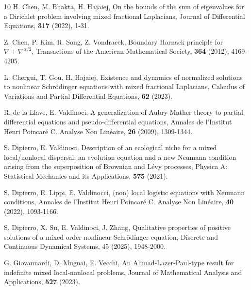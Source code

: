 \documentclass[12pt,a4paper,reqno]{amsart}
\numberwithin{equation}{section}
\begin{document}
\begin{thebibliography}{10}
H. Chen, M. Bhakta, H. Hajaiej,
{On the bounds of the sum of eigenvalues for a Dirichlet
problem involving mixed fractional Laplacians},
Journal of Differential Equations,
\textbf{317} (2022), 1-31.



Z. Chen, P. Kim, R. Song, Z. Vondracek,
{Boundary Harnack principle for $\nabla+\nabla^{\alpha/2}$},
Transactions of the American Mathematical Society,
\textbf{364} (2012), 4169-4205.



L. Chergui, T. Gou, H. Hajaiej,
{Existence and dynamics of normalized solutions to nonlinear Schr\"odinger equations with mixed fractional Laplacians},
Calculus of Variations and Partial Differential Equations,
\textbf{62} (2023).



R. de la Llave, E. Valdinoci,
{A generalization of Aubry-Mather theory to partial differential equations and
pseudo-differential equations},
Annales de l'Institut Henri Poincar\'{e} C. Analyse Non Lin\'{e}aire,
\textbf{26} (2009), 1309-1344.



S. Dipierro, E. Valdinoci,
{Description of an ecological niche for a mixed local/nonlocal dispersal: an evolution equation and a new Neumann condition arising from the superposition of Brownian and L\'{e}vy processes},
Physica A: Statistical Mechanics and its Applications,
\textbf{575} (2021).

S. Dipierro, E. Lippi, E. Valdinocci,
{(non) local logistic equations with Neumann conditions},
Annales de l'Institut Henri Poincar\'{e} C. Analyse Non Lin\'{e}aire,
\textbf{40} (2022), 1093-1166.


S. Dipierro, X. Su, E. Valdinoci, J. Zhang,
Qualitative properties of positive solutions of a mixed order nonlinear Schr\"{o}dinger equation,
Discrete and Continuous Dynamical Systems,
45 (2025), 1948-2000.

G. Giovannardi, D. Mugnai, E. Vecchi,
{An Ahmad-Lazer-Paul-type result for indefinite mixed local-nonlocal problems},
Journal of Mathematical Analysis and Applications, \textbf{527} (2023).



\end{thebibliography}
\end{document}
